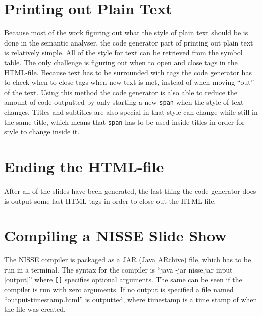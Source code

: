 \section{Printing out Plain Text}
Because most of the work figuring out what the style of plain text should be is done in the semantic analyser, the code generator part of printing out plain text is relatively simple. All of the style for text can be retrieved from the symbol table. The only challenge is figuring out when to open and close tags in the HTML-file. Because text has to be surrounded with tags the code generator has to check when to close tags when new text is met, instead of when moving ``out'' of the text. Using this method the code generator is also able to reduce the amount of code outputted by only starting a new \texttt{span} when the style of text changes. Titles and subtitles are also special in that style can change while still in the same title, which means that \texttt{span} has to be used inside titles in order for style to change inside it.

\section{Ending the HTML-file}
After all of the slides have been generated, the last thing the code generator does is output some last HTML-tags in order to close out the HTML-file.

\section{Compiling a NISSE Slide Show}
The NISSE compiler is packaged as a JAR (Java ARchive) file, which has to be run in a terminal. The syntax for the compiler is ``java -jar nisse.jar input [output]'' where \texttt{[]} specifies optional arguments. The same can be seen if the compiler is run with zero arguments. If no output is specified a file named ``output-timestamp.html'' is outputted, where timestamp is a time stamp of when the file was created.